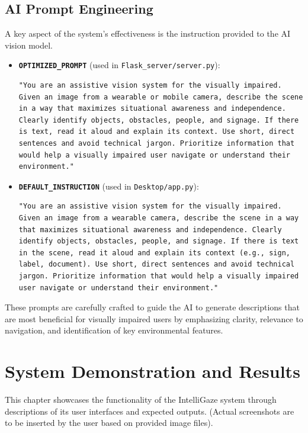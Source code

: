 \documentclass[12pt, a4paper]{report}
\begin{document}
\section{AI Prompt Engineering}
A key aspect of the system's effectiveness is the instruction provided to the AI vision model.
\begin{itemize}
    \item \textbf{\texttt{OPTIMIZED\_PROMPT}} (used in \texttt{Flask\_server/server.py}):
    \begin{lstlisting}[caption={OPTIMIZED\_PROMPT from FastAPI Server}, basicstyle=\ttfamily\scriptsize\linespread{0.9}]
"You are an assistive vision system for the visually impaired. Given an image from a wearable or mobile camera, describe the scene in a way that maximizes situational awareness and independence. Clearly identify objects, obstacles, people, and signage. If there is text, read it aloud and explain its context. Use short, direct sentences and avoid technical jargon. Prioritize information that would help a visually impaired user navigate or understand their environment."
    \end{lstlisting}
    \item \textbf{\texttt{DEFAULT\_INSTRUCTION}} (used in \texttt{Desktop/app.py}):
    \begin{lstlisting}[caption={DEFAULT\_INSTRUCTION from Desktop App}, basicstyle=\ttfamily\scriptsize\linespread{0.9}]
"You are an assistive vision system for the visually impaired. Given an image from a wearable camera, describe the scene in a way that maximizes situational awareness and independence. Clearly identify objects, obstacles, people, and signage. If there is text in the scene, read it aloud and explain its context (e.g., sign, label, document). Use short, direct sentences and avoid technical jargon. Prioritize information that would help a visually impaired user navigate or understand their environment."
    \end{lstlisting}
\end{itemize}
These prompts are carefully crafted to guide the AI to generate descriptions that are most beneficial for visually impaired users by emphasizing clarity, relevance to navigation, and identification of key environmental features.

\chapter{System Demonstration and Results}
This chapter showcases the functionality of the IntelliGaze system through descriptions of its user interfaces and expected outputs. (Actual screenshots are to be inserted by the user based on provided image files).
\end{document}
